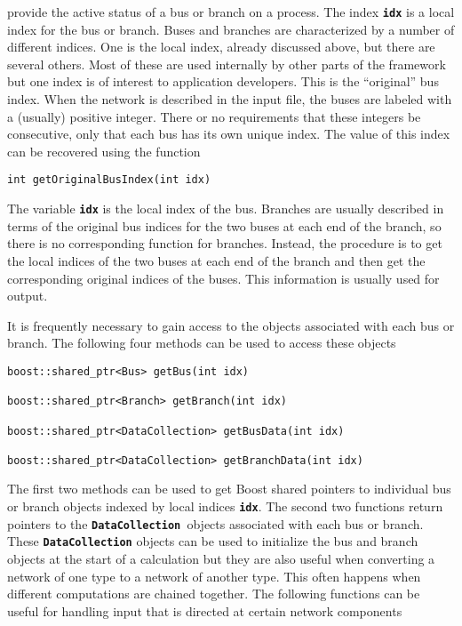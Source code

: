 provide the active status of a bus or branch on a process. The index \texttt{\textbf{idx}} is a local index for the bus or branch.
Buses and branches are characterized by a number of different indices. One is the local index, already discussed above, but there are several others. Most of these are used internally by other parts of the framework but one index is of interest to application developers. This is the ``original'' bus index. When the network is described in the input file, the buses are labeled with a (usually) positive integer. There or no requirements that these integers be consecutive, only that each bus has its own unique index. The value of this index can be recovered using the function

{
\color{red}
\begin{Verbatim}[fontseries=b]
int getOriginalBusIndex(int idx)
\end{Verbatim}
}

The variable \texttt{\textbf{idx}} is the local index of the bus. Branches are usually described in terms of the original bus indices for the two buses at each end of the branch, so there is no corresponding function for branches. Instead, the procedure is to get the local indices of the two buses at each end of the branch and then get the corresponding original indices of the buses. This information is usually used for output.

It is frequently necessary to gain access to the objects associated with each bus or branch. The following four methods can be used to access these objects

{
\color{red}
\begin{Verbatim}[fontseries=b]
boost::shared_ptr<Bus> getBus(int idx)

boost::shared_ptr<Branch> getBranch(int idx)

boost::shared_ptr<DataCollection> getBusData(int idx)

boost::shared_ptr<DataCollection> getBranchData(int idx)
\end{Verbatim}
}

The first two methods can be used to get Boost shared pointers to individual bus or branch objects indexed by local indices \texttt{\textbf{idx}}. The second two functions return pointers to the \texttt{\textbf{DataCollection }}objects associated with each bus or branch. These \texttt{\textbf{DataCollection}} objects can be used to initialize the bus and branch objects at the start of a calculation but they are also useful when converting a network of one type to a network of another type. This often happens when different computations are chained together.
The following functions can be useful for handling input that is directed at certain network components

